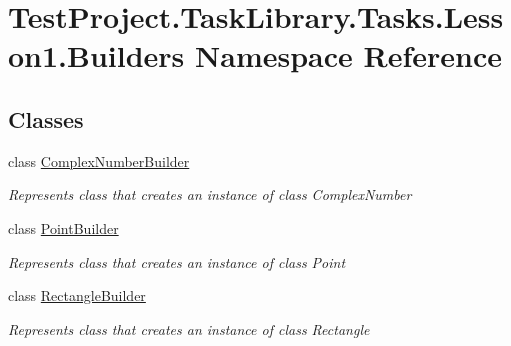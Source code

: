 \hypertarget{namespace_test_project_1_1_task_library_1_1_tasks_1_1_lesson1_1_1_builders}{}\section{Test\+Project.\+Task\+Library.\+Tasks.\+Lesson1.\+Builders Namespace Reference}
\label{namespace_test_project_1_1_task_library_1_1_tasks_1_1_lesson1_1_1_builders}
\subsection*{Classes}
\begin{DoxyCompactItemize}
\item 
class \mbox{\hyperlink{class_test_project_1_1_task_library_1_1_tasks_1_1_lesson1_1_1_builders_1_1_complex_number_builder}{Complex\+Number\+Builder}}
\begin{DoxyCompactList}\small\item\em Represents class that creates an instance of class Complex\+Number \end{DoxyCompactList}\item 
class \mbox{\hyperlink{class_test_project_1_1_task_library_1_1_tasks_1_1_lesson1_1_1_builders_1_1_point_builder}{Point\+Builder}}
\begin{DoxyCompactList}\small\item\em Represents class that creates an instance of class Point \end{DoxyCompactList}\item 
class \mbox{\hyperlink{class_test_project_1_1_task_library_1_1_tasks_1_1_lesson1_1_1_builders_1_1_rectangle_builder}{Rectangle\+Builder}}
\begin{DoxyCompactList}\small\item\em Represents class that creates an instance of class Rectangle \end{DoxyCompactList}\end{DoxyCompactItemize}

